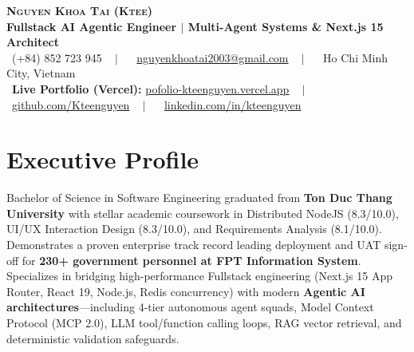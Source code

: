 \documentclass[letterpaper,10pt]{article}
\begin{document}
\begin{center}
    {\Huge \scshape \textbf{Nguyen Khoa Tai (Ktee)}} \\ \vspace{2pt}
    {\large \textbf{\color{accentBlue}Fullstack AI Agentic Engineer $|$ Multi-Agent Systems \& Next.js 15 Architect}} \\ \vspace{5pt}
    \small 
    \faPhone\ (+84) 852 723 945 ~ $|$ ~
    \faEnvelope\ \href{mailto:nguyenkhoatai2003@gmail.com}{nguyenkhoatai2003@gmail.com} ~ $|$ ~
    \faMapMarker*\ Ho Chi Minh City, Vietnam \\ \vspace{3pt}
    \faGlobe\ \textbf{Live Portfolio (Vercel):} \href{https://pofolio-kteenguyen.vercel.app}{\color{accentBlue}\underline{pofolio-kteenguyen.vercel.app}} ~ $|$ ~
    \faGithub\ \href{https://github.com/Kteenguyen}{github.com/Kteenguyen} ~ $|$ ~
    \faLinkedin\ \href{https://linkedin.com}{linkedin.com/in/kteenguyen}
\end{center}

\section{Executive Profile}
\small{
Bachelor of Science in Software Engineering graduated from \textbf{Ton Duc Thang University} with stellar academic coursework in Distributed NodeJS (8.3/10.0), UI/UX Interaction Design (8.3/10.0), and Requirements Analysis (8.1/10.0). Demonstrates a proven enterprise track record leading deployment and UAT sign-off for \textbf{230+ government personnel at FPT Information System}. Specializes in bridging high-performance Fullstack engineering (Next.js 15 App Router, React 19, Node.js, Redis concurrency) with modern \textbf{Agentic AI architectures}---including 4-tier autonomous agent squads, Model Context Protocol (MCP 2.0), LLM tool/function calling loops, RAG vector retrieval, and deterministic validation safeguards.
}

\end{document}
